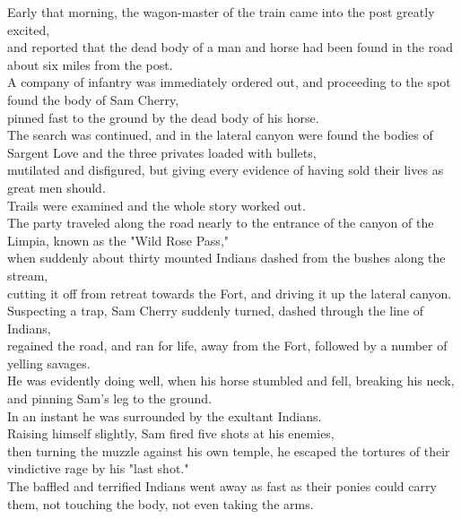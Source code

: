 
Early that morning, the wagon-master of the train came into the post greatly excited,\\
and reported that the dead body of a man and horse had been found in the road about six miles from the post.\\

A company of infantry was immediately ordered out, and proceeding to the spot found the body of Sam Cherry,\\
pinned fast to the ground by the dead body of his horse.\\

The search was continued, and in the lateral canyon were found the bodies of Sargent Love and the three privates loaded with bullets,\\
mutilated and disfigured, but giving every evidence of having sold their lives as great men should.\\

Trails were examined and the whole story worked out.\\

The party traveled along the road nearly to the entrance of the canyon of the Limpia, known as the "Wild Rose Pass,"\\
when suddenly about thirty mounted Indians dashed from the bushes along the stream,\\
cutting it off from retreat towards the Fort, and driving it up the lateral canyon.\\

Suspecting a trap, Sam Cherry suddenly turned, dashed through the line of Indians,\\
regained the road, and ran for life, away from the Fort, followed by a number of yelling savages.\\

He was evidently doing well, when his horse stumbled and fell, breaking his neck, and pinning Sam's leg to the ground.\\
In an instant he was surrounded by the exultant Indians.\\

Raising himself slightly, Sam fired five shots at his enemies,\\
then turning the muzzle against his own temple, he escaped the tortures of their vindictive rage by his "last shot."\\
The baffled and terrified Indians went away as fast as their ponies could carry them, not touching the body, not even taking the arms.\\

